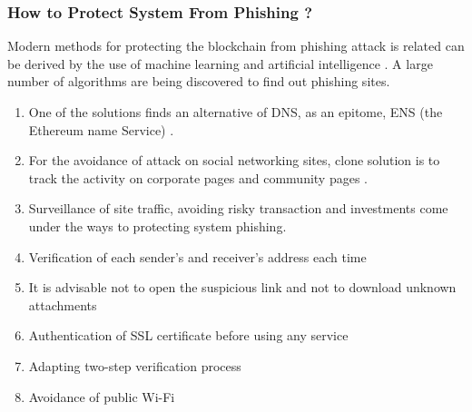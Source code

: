 \documentclass[a4paper,twoside,12pt]{report}
\begin{document}
\begin{spacing}{1.5}
\subsubsection{How to Protect System From Phishing ?}
Modern methods for protecting the blockchain from phishing attack is related can be derived by the use of machine learning and artificial intelligence \cite{blockchainthreatreport,andryukhinphishing}. A large number of algorithms are being discovered to find out phishing sites.
\begin{enumerate}
	\item{One of the solutions finds an alternative of DNS, as an epitome, ENS (the Ethereum name Service) \cite{andryukhinphishing}.}
	\item{For the avoidance of attack on social networking sites, clone solution is to track the activity on corporate pages and community pages \cite{andryukhinphishing}.}
	\item{Surveillance of site traffic, avoiding risky transaction and investments come under  the ways to protecting system phishing.}
	\item{Verification of each sender's and receiver's address each time}
	\item{It is advisable not to open the suspicious link and not to download unknown attachments}
	\item{Authentication of SSL certificate before using any service}
	\item{Adapting two-step verification process}
	\item{Avoidance of public Wi-Fi}
\end{enumerate}  

\end{spacing}
\end{document}
